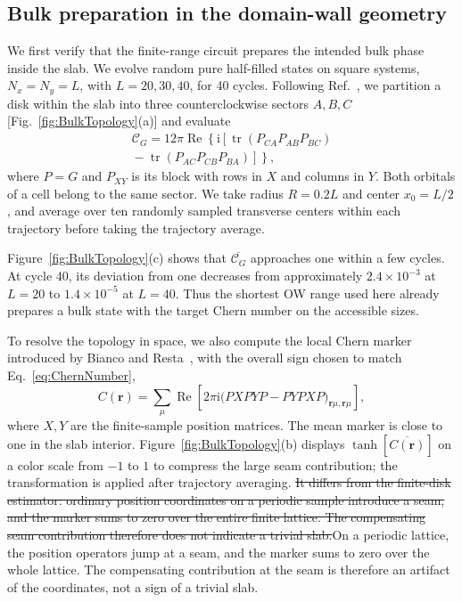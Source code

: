 \documentclass[aps,prb,10pt,twocolumn,superscriptaddress,longbibliography,floatfix]{revtex4-2}
\newcommand{\ii}{\mathrm{i}}
\newcommand{\mc}[1]{\mathcal{#1}}
\newcommand{\bfr}{\boldsymbol r}
\newcommand{\claudeadd}[1]{{\color{orange}#1}}
\newcommand{\claudedel}[1]{{\color{orange}\sout{#1}}}
\begin{document}
{\color{blue}
\subsection{Bulk preparation in the domain-wall geometry}
\label{sec:BulkTopology}

We first verify that the finite-range circuit prepares the intended bulk phase inside the slab. We evolve random pure half-filled states on square systems, $N_x=N_y=L$, with $L=20,30,40$, for 40 cycles. Following Ref.~\cite{Kitaev2006}, we partition a disk within the slab into three counterclockwise sectors $A,B,C$ [Fig.~\ref{fig:BulkTopology}(a)] and evaluate
\begin{align}
    \mc C_G=12\pi\operatorname{Re}\!\left\{\ii\left[\operatorname{tr}(P_{CA}P_{AB}P_{BC})\right.\right.\nonumber\\
    \left.\left.{}-\operatorname{tr}(P_{AC}P_{CB}P_{BA})\right]\right\},
    \label{eq:KitaevChern}
\end{align}
where \claudeadd{$P=G$} and $P_{XY}$ is its block with rows in $X$ and columns in $Y$. Both orbitals of a cell belong to the same sector. We take radius $R=0.2L$ and center $x_0=L/2$, and average over ten randomly sampled transverse centers within each trajectory before taking the trajectory average.

Figure~\ref{fig:BulkTopology}(c) shows that $\overline{\mc C_G}$ approaches one within a few cycles. At cycle 40, its deviation from one decreases from approximately $2.4\times10^{-3}$ at $L=20$ to $1.4\times10^{-5}$ at $L=40$. Thus the shortest OW range used here already prepares a bulk state with the target Chern number on the accessible sizes.

To resolve the topology in space, we also compute the local Chern marker introduced by Bianco and Resta~\cite{BiancoResta2011}, with the overall sign chosen to match Eq.~\eqref{eq:ChernNumber},
\begin{equation}
 C(\bfr)=\sum_\mu\operatorname{Re}\!\left[2\pi\ii\big(PXPYP-PYPXP\big)_{\bfr\mu,\bfr\mu}\right],
 \label{eq:LocalMarker}
\end{equation}
where $X,Y$ are the finite-sample position matrices. The mean marker is close to one in the slab interior. Figure~\ref{fig:BulkTopology}(b) displays $\tanh[\overline{C(\bfr)}]$ on a color scale from $-1$ to $1$ to compress the large seam contribution; the transformation is applied after trajectory averaging. \claudedel{It differs from the finite-disk estimator: ordinary position coordinates on a periodic sample introduce a seam, and the marker sums to zero over the entire finite lattice. The compensating seam contribution therefore does not indicate a trivial slab.}\claudeadd{On a periodic lattice, the position operators jump at a seam, and the marker sums to zero over the whole lattice. The compensating contribution at the seam is therefore an artifact of the coordinates, not a sign of a trivial slab.}
}
\end{document}
